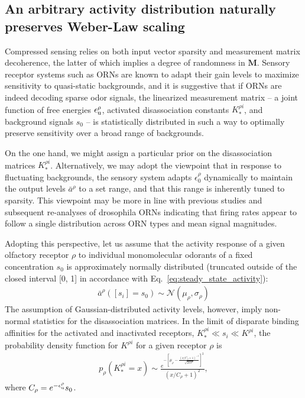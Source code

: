 
\subsection*{An arbitrary activity distribution naturally preserves Weber-Law scaling} 


Compressed sensing relies on both input vector sparsity and measurement matrix decoherence, the latter of which implies a degree of randomness in $\mathbf M$. Sensory receptor systems such as ORNs are known to adapt their gain levels to maximize sensitivity to quasi-static backgrounds, and it is suggestive that if ORNs are indeed decoding sparse odor signals, the linearized measurement matrix -- a joint function of free energies $\epsilon_{\text u}^\rho$, activated disassociation constants $K_*^{\rho i}$, and background signals $s_0$ -- is statistically distributed in such a way to optimally preserve sensitivity over a broad range of backgrounds. 

On the one hand, we might assign a particular prior on the disassociation matrices $K_*^{\rho i}$. Alternatively, we may adopt the viewpoint that in response to fluctuating backgrounds, the sensory system adapts $\epsilon^\rho_0$ dynamically to maintain the output levels $\bar a^\rho$ to a set range, and that this range is inherently tuned to sparsity. This viewpoint may be more in line with previous studies and subsequent re-analyses of drosophila ORNs indicating that firing rates appear to follow a single distribution across ORN types and mean signal magnitudes. 

Adopting this perspective, let us assume that the activity response of a given olfactory receptor $\rho$ to individual monomolecular odorants of a fixed concentration $s_0$ is approximately normally distributed (truncated outside of the closed interval [0, 1] in accordance with Eq.~\ref{eq:steady_state_activity}):
\begin{align}
\bar a^\rho([s_i] = s_0) \sim \mathcal N(\mu_\rho, \sigma_\rho)
\label{eq:monomolecular_activity_levels}
\end{align} 
The assumption of Gaussian-distributed activity levels, however, imply non-normal statistics for the disassociation matrices. In the limit of disparate binding affinities for the activated and inactivated receptors, $K^{\rho i}_* \ll s_i \ll K^{\rho i}$, the probability density function for $K^{\rho i}$ for a given receptor $\rho$ is
\begin{align}
p_\rho(K_*^{\rho i} = x)  \sim \frac{e^{-\left[\mu_\rho - \frac{(x/C_\rho + 1)^{-1}}{\sqrt{2\pi \sigma^2}}\right]^2}}{(x/C_\rho + 1)^2}, 
\label{eq:distribution_Kk2_normal_activity}
\end{align}
where $C_\rho = e^{-\epsilon_{\text u}^\rho}s_0$. 

